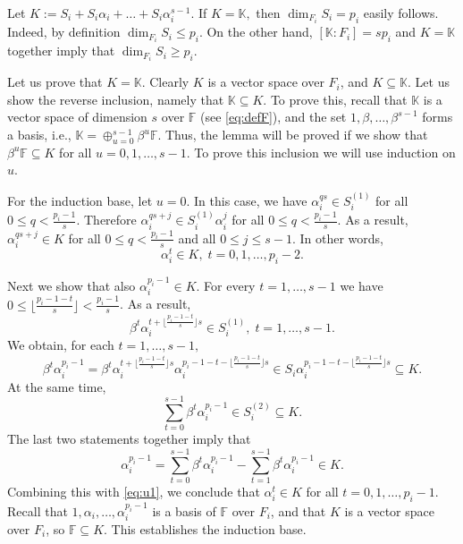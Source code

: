 \documentclass[11pt,onecolumn]{IEEEtran}
\begin{document}
\begin{IEEEproof} Let {$K:=S_i + S_i\alpha_i+\dots + S_i\alpha_i^{s-1}$.} If $K=\mathbb{K},$ then $\dim_{F_i} S_i = p_i$
easily follows. Indeed, by definition $\dim_{F_i} S_i \le p_i$. On the other hand, $[\mathbb{K}:F_i]=s p_i$ and
{$K=\mathbb{K}$} together imply that $\dim_{F_i} S_i \ge p_i$. %

Let us prove that $K=\mathbb{K}.$ Clearly $K$ is a vector space over $F_i$, and $K\subseteq \mathbb{K}$. 
Let us show the reverse inclusion, namely that $\mathbb{K}\subseteq K$. To prove this, recall that 
$\mathbb{K}$ is a vector space of dimension $s$ over $\mathbb{F}$ (see \eqref{eq:defF}), and the set $1,\beta,\dots,\beta^{s-1}$
forms a basis, i.e.,  $\mathbb{K}=\oplus_{u=0}^{s-1}\beta^u\mathbb{F}$.
Thus, the lemma will be proved if we show that 
$\beta^u\mathbb{F} \subseteq K$ for all $u=0,1,\dots,s-1.$ 
To prove this inclusion we will use induction on $u$.

For the induction base, let $u=0$. 
In this case, we have $\alpha_i^{qs} \in S_i^{(1)}$ for all $0\leq q<\frac{p_i-1}{s}$.
Therefore $\alpha_i^{qs+j} \in S_i^{(1)} \alpha_i^j$ for all $0\leq q<\frac{p_i-1}{s}$.
As a result, $\alpha_i^{qs+j} \in K$ for all $0\le q<\frac{p_i-1}{s}$ and all $0 \le j \le s-1$.
In other words, 
\begin{equation}\label{eq:u1}
\alpha_i^t \in K ,\; t=0,1,\dots, p_i-2.
\end{equation}

Next we show that also $\alpha_i^{p_i-1} \in K$.
For every $t=1,\dots,s-1$ we have $0\le \lfloor \frac{p_i-1-t}{s} \rfloor <\frac{p_i-1}{s}$.
As a result,
$$
\beta^t \alpha_i^{t+ \lfloor \frac{p_i-1-t}{s} \rfloor s} \in S_i^{(1)}, \;
t=1,\dots,s-1.
$$
We obtain, for each $t=1,\dots,s-1,$
$$
\beta^t \alpha_i^{p_i-1} = 
\beta^t \alpha_i^{t+ \lfloor \frac{p_i-1-t}{s} \rfloor s} 
\alpha_i^{p_i-1-t - \lfloor \frac{p_i-1-t}{s} \rfloor s}
 \in S_i  \alpha_i^{p_i-1-t - \lfloor \frac{p_i-1-t}{s} \rfloor s} \subseteq K.
$$
At the same time,
$$
\sum_{t=0}^{s - 1}\beta^t \alpha_i^{p_i-1} \in S_i^{(2)} \subseteq K.
$$
 The last two statements together imply that
$$
\alpha_i^{p_i-1} = \sum_{t=0}^{s - 1}\beta^t \alpha_i^{p_i-1}
- \sum_{t=1}^{s - 1}\beta^t \alpha_i^{p_i-1}  \in K.
$$
Combining this with \eqref{eq:u1}, we conclude that
$\alpha_i^t \in K$  for all $t=0,1,\dots, p_i-1$.
Recall that $1,\alpha_i,\dots,\alpha_i^{p_i-1}$  is a basis of $\mathbb{F}$ over $F_i$, and that
$K$ is a vector space over $F_i$, so $\mathbb{F} \subseteq K$.
This establishes the induction base.


\end{IEEEproof}
\end{document}
